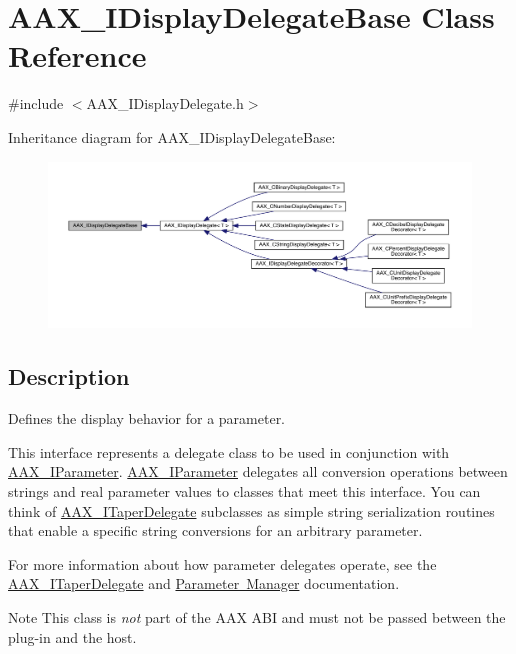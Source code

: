 \hypertarget{a01797}{}\section{A\+A\+X\+\_\+\+I\+Display\+Delegate\+Base Class Reference}
\label{a01797}


{\ttfamily \#include $<$A\+A\+X\+\_\+\+I\+Display\+Delegate.\+h$>$}



Inheritance diagram for A\+A\+X\+\_\+\+I\+Display\+Delegate\+Base\+:
\nopagebreak
\begin{figure}[H]
\begin{center}
\leavevmode
\includegraphics[width=350pt]{a01796}
\end{center}
\end{figure}


\subsection{Description}
Defines the display behavior for a parameter. 

This interface represents a delegate class to be used in conjunction with \mbox{\hyperlink{a01857}{A\+A\+X\+\_\+\+I\+Parameter}}. \mbox{\hyperlink{a01857}{A\+A\+X\+\_\+\+I\+Parameter}} delegates all conversion operations between strings and real parameter values to classes that meet this interface. You can think of \mbox{\hyperlink{a01881}{A\+A\+X\+\_\+\+I\+Taper\+Delegate}} subclasses as simple string serialization routines that enable a specific string conversions for an arbitrary parameter.

For more information about how parameter delegates operate, see the \mbox{\hyperlink{a01881}{A\+A\+X\+\_\+\+I\+Taper\+Delegate}} and \mbox{\hyperlink{a00814}{Parameter Manager}} documentation.

\begin{DoxyNote}{Note}
This class is {\itshape not} part of the A\+AX A\+BI and must not be passed between the plug-\/in and the host. 
\end{DoxyNote}
